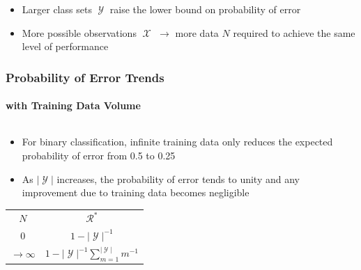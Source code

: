 \documentclass{beamer}
\DeclareMathOperator{\Xcal}{\mathcal{X}}
\DeclareMathOperator{\Ycal}{\mathcal{Y}}
\DeclareMathOperator{\Rcal}{\mathcal{R}}
\begin{document}
\begin{frame}
\begin{columns}[c]
\begin{column}{.5\linewidth}
\end{column}

\end{columns}

\begin{itemize}
\item Larger class sets $\Ycal$ raise the lower bound on probability of error
\item More possible observations $\Xcal$ $\longrightarrow$ more data $N$ required to achieve the same level of performance
\end{itemize}

\end{frame}




\begin{frame}
\frametitle{Probability of Error Trends}
\framesubtitle{with Training Data Volume}

\begin{columns}[c]

\begin{column}{.5\linewidth}

\begin{itemize}
\item For binary classification, infinite training data only reduces the expected probability of error from 0.5 to 0.25
\item As $|\Ycal|$ increases, the probability of error tends to unity and any improvement due to training data becomes negligible
\end{itemize}

\begin{table}
\renewcommand{\arraystretch}{1.3}
\begin{tabular}{| c | c |}
\hline 
$N$ & $\Rcal^*$ \\
\hhline{|=|=|}
$0$ & $1 - |\Ycal|^{-1}$  \\ 
\hline
$\to \infty$ & $1 - |\Ycal|^{-1} \sum_{m=1}^{|\Ycal|} m^{-1}$ \\
\hline
\end{tabular}
\end{table}

\end{column}

\begin{column}{.5\linewidth}


\end{column}
\end{columns}
\end{frame}
\end{document}
